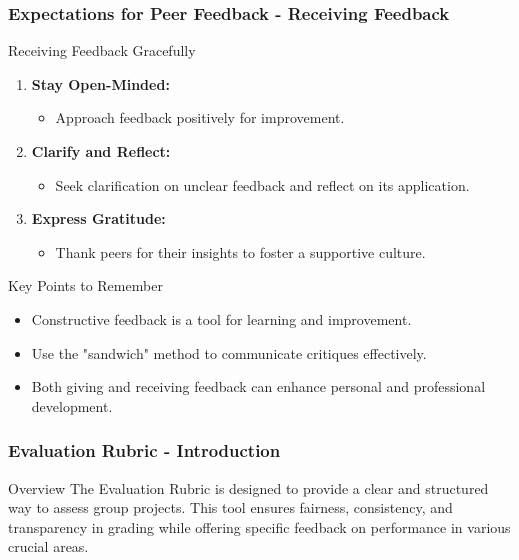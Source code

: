 \documentclass{beamer}
\begin{document}
\begin{frame}[fragile]
    \frametitle{Expectations for Peer Feedback - Receiving Feedback}
    \begin{block}{Receiving Feedback Gracefully}
        \begin{enumerate}
            \item \textbf{Stay Open-Minded:}
            \begin{itemize}
                \item Approach feedback positively for improvement.
            \end{itemize}
            \item \textbf{Clarify and Reflect:}
            \begin{itemize}
                \item Seek clarification on unclear feedback and reflect on its application.
            \end{itemize}
            \item \textbf{Express Gratitude:}
            \begin{itemize}
                \item Thank peers for their insights to foster a supportive culture.
            \end{itemize}
        \end{enumerate}
    \end{block}

    \begin{block}{Key Points to Remember}
        \begin{itemize}
            \item Constructive feedback is a tool for learning and improvement.
            \item Use the "sandwich" method to communicate critiques effectively.
            \item Both giving and receiving feedback can enhance personal and professional development.
        \end{itemize}
    \end{block}
\end{frame}

\begin{frame}[fragile]
    \frametitle{Evaluation Rubric - Introduction}
    \begin{block}{Overview}
        The Evaluation Rubric is designed to provide a clear and structured way to assess group projects. 
        This tool ensures fairness, consistency, and transparency in grading while offering specific feedback on performance in various crucial areas.
    \end{block}
\end{frame}
\end{document}
